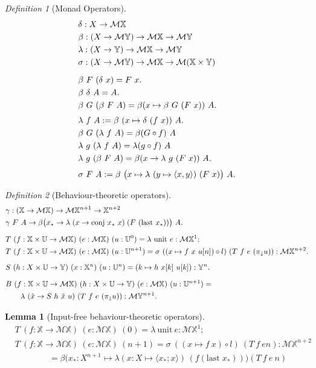 \documentclass[12pt,a4paper]{article}
\newtheorem*{lemma*}{Lemma}
\theoremstyle{remark}
\newtheorem*{definition*}{Definition}
\newcommand{\pure}{\delta}
\newcommand{\bind}{\beta}
\newcommand{\lift}{\lambda}
\renewcommand{\skew}{\sigma}
\newcommand{\scnj}{\gamma}
\newcommand{\U}{\mathbb{U}}
\newcommand{\X}{\mathbb{X}}
\newcommand{\Y}{\mathbb{Y}}
\newcommand{\M}{\mathcal{M}}
\newcommand{\p}{\pi}
\newcommand{\pr}{\p_{\downarrow}}
\newcommand{\conjW}{\mathrm{conj}}
\newcommand{\lastW}{\mathrm{last}}
\begin{document}
\begin{definition*}[Monad Operators]
\[ \begin{aligned}
&\pure : X \to \M\X \\
&\bind : (X \to \M\Y) \to \M\X \to \M\Y \\
&\lift : (X \to \Y) \to \M\X \to \M\Y \\
&\skew : (X \to \M\Y) \to \M\X \to \M(\X\times\Y) \\[2\jot]
&\bind\ F\ (\pure\ x) = F\ x .\\
&\bind\ \pure\ A = A . \\
&\bind\ G\ (\bind\ F\ A) = \bind (x \mapsto \bind\ G\ (F\ x))\ A. \\[\jot]
&\lift\ f\ A := \bind\ (x \mapsto \pure\ (f\ x))\ A. \\
&\bind\ G\ (\lift\ f\ A) = \bind (G \circ f)\ A \\
&\lift\ g\ (\lift\ f\ A) = \lift (g \circ f)\ A \\
&\lift\ g\ (\bind\ F\ A) = \bind (x \to \lift\ g\ (F\ x))\ A. \\[\jot]
&\skew\ F\ A := \bind\ \bigl(x \mapsto \lift\ (y \mapsto \langle x,y\rangle)\ (F\ x)\bigr)\ A.
\end{aligned} \]
\end{definition*}

\begin{definition*}[Behaviour-theoretic operators]
\[ \begin{aligned}
&\scnj: (\X\to\M\X) \to \M\X^{n+1} \to \X^{n+2} \\
&\scnj\ F\ A \to \bind \bigl( x_* \to \lift\;(x \to \conjW\ x_*\ x)\;(F\ (\lastW\ x_*)) \bigr)\ A. \\[2\jot]
&T\ (f:\X\times\U\to\M\X)\ (e:\M\X)\ (u:\U^0) = \lift\ \mathrm{unit}\ e : \M\X^{1}; \\
&T\ (f:\X\times\U\to\M\X)\ (e:\M\X)\ (u:\U^{n+1}) = \skew\ ((x\mapsto f\ x\ u[n])\circ l)\ (T\ f\ e\ (\pr u)) : \M\X^{n+2} . \\[2\jot]
&S\ (h:X\times\U\to\Y)\ (x:\X^n)\ (u:\U^n) = (k \mapsto h\ x[k]\ u[k]) : \Y^n . \\[2\jot]
&B\ (f:\X\times\U\to\M\X)\ (h:X\times\U\to\Y)\ (e:\M\X)\ (u:\U^{n+1}) = \\ & \qquad \lift\ (\tilde{x}\to S\ h\ \tilde{x}\ u)\ (T\ f\ e\ (\pr u)) : \M\Y^{n+1}.
\end{aligned} \]
\end{definition*}

\begin{lemma*}[Input-free behaviour-theoretic operators]
\[ \begin{aligned}
&T\ (f:\X\to\M\X)\ (e:\M\X)\ (0) = \lift\ \mathrm{unit}\ e : \M\X^{1}; \\
&T\ (f:\X\to\M\X)\ (e:\M\X)\ (n+1) = \skew\ ((x\mapsto f\ x)\circ l)\ (T\ f\ e n) : \M\X^{n+2} \\
& \qquad\qquad = \bind \bigl(x_* : X^{n+1} \mapsto \lift (x:X\mapsto \langle x_*;x\rangle)\,(f(\lastW\;x_*))\bigr) (T\ f\ e\ n)\\
\end{aligned} \]
\end{lemma*}
\end{document}
